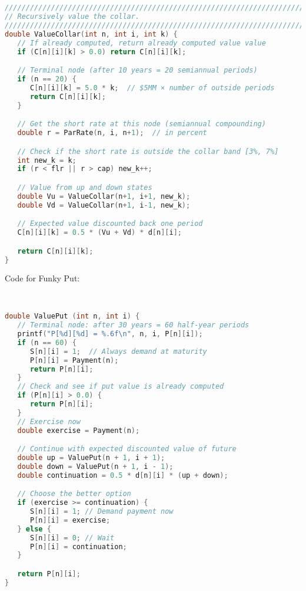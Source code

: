 \documentclass{report}
\begin{document}
\begin{lstlisting}[language=C++]


////////////////////////////////////////////////////////////////////////////////
// Recursively value the collar.
////////////////////////////////////////////////////////////////////////////////
double ValueCollar(int n, int i, int k) {
   // If already computed, return already computed value value
   if (C[n][i][k] > 0.0) return C[n][i][k];

   // Terminal node (after 10 years = 20 semiannual periods)
   if (n == 20) {
      C[n][i][k] = 5.0 * k;  // $5MM × number of outside periods
      return C[n][i][k];
   }

   // Get the short rate at this node (semiannual compounding)
   double r = ParRate(n, i, n+1);  // in percent

   // Check if the short rate is outside the collar band [3%, 7%]
   int new_k = k;
   if (r < flr || r > cap) new_k++;

   // Value from up and down states
   double Vu = ValueCollar(n+1, i+1, new_k);
   double Vd = ValueCollar(n+1, i-1, new_k);

   // Expected value discounted back one period
   C[n][i][k] = 0.5 * (Vu + Vd) * d[n][i];

   return C[n][i][k];
}


\end{lstlisting}
\newpage
Code for Funky Put:
\begin{lstlisting}[language=C++]


double ValuePut (int n, int i) {
   // Terminal node: after 30 years = 60 half-year periods
   printf("P[%d][%d] = %.6f\n", n, i, P[n][i]);
   if (n == 60) {
      S[n][i] = 1;  // Always demand at maturity
      P[n][i] = Payment(n);
      return P[n][i];
   }
   // Check and see if put value is already computed
   if (P[n][i] > 0.0) {
      return P[n][i];
   }
   // Exercise now
   double exercise = Payment(n);

   // Continue with expected discounted value of future
   double up = ValuePut(n + 1, i + 1);
   double down = ValuePut(n + 1, i - 1);
   double continuation = 0.5 * d[n][i] * (up + down);

   // Choose the better option
   if (exercise >= continuation) {
      S[n][i] = 1; // Demand payment now
      P[n][i] = exercise;
   } else {
      S[n][i] = 0; // Wait
      P[n][i] = continuation;
   }

   return P[n][i];
}

\end{lstlisting}
\end{document}
